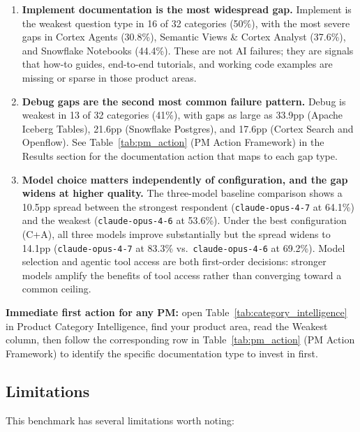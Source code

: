 \documentclass[10pt,letterpaper]{article}
\begin{document}
\begin{enumerate}[resume]
  \item \textbf{Implement documentation is the most widespread gap.} Implement is the weakest question type in 16 of 32 categories (50\%), with the most severe gaps in Cortex Agents (30.8\%), Semantic Views \& Cortex Analyst (37.6\%), and Snowflake Notebooks (44.4\%). These are not AI failures; they are signals that how-to guides, end-to-end tutorials, and working code examples are missing or sparse in those product areas.

  \item \textbf{Debug gaps are the second most common failure pattern.} Debug is weakest in 13 of 32 categories (41\%), with gaps as large as 33.9pp (Apache Iceberg Tables), 21.6pp (Snowflake Postgres), and 17.6pp (Cortex Search and Openflow). See Table~\ref{tab:pm_action} (PM Action Framework) in the Results section for the documentation action that maps to each gap type.

  \item \textbf{Model choice matters independently of configuration, and the gap widens at higher quality.} The three-model baseline comparison shows a 10.5pp spread between the strongest respondent (\texttt{claude-opus-4-7} at 64.1\%) and the weakest (\texttt{claude-opus-4-6} at 53.6\%). Under the best configuration (C+A), all three models improve substantially but the spread widens to 14.1pp (\texttt{claude-opus-4-7} at 83.3\% vs.\ \texttt{claude-opus-4-6} at 69.2\%). Model selection and agentic tool access are both first-order decisions: stronger models amplify the benefits of tool access rather than converging toward a common ceiling.
\end{enumerate}

\textbf{Immediate first action for any PM:} open Table~\ref{tab:category_intelligence} in Product Category Intelligence, find your product area, read the Weakest column, then follow the corresponding row in Table~\ref{tab:pm_action} (PM Action Framework) to identify the specific documentation type to invest in first.

\subsection*{Limitations}

This benchmark has several limitations worth noting:
\end{document}
